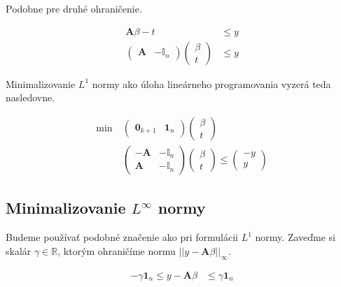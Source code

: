 \documentclass[12pt,oneside,a4paper,slovak]{article}
\begin{document}
Podobne pre druhé ohraničenie.

\begin{align*}
	\mathbf{A} \beta - t &\leq y \\
	\left(
		\begin{array}{c|c}
			\mathbf{A} & -\mathbb{I}_n
		\end{array}
	\right)
	\left(
		\begin{array}{c}
			\beta \\
			\hline
			t
		\end{array}
	\right) &\leq y
\end{align*}

Minimalizovanie $L^{1}$ normy ako úloha lineárneho programovania vyzerá teda nasledovne.

\begin{align*}
	\text{min}~ &
	\left(
		\begin{array}{c|c}
			\mathbf{0}_{k+1} & \mathbf{1}_n
		\end{array}
	\right)
	\left(
		\begin{array}{c}
			\beta \\
			\hline
			t
		\end{array}
	\right) \\
	&\left(
		\begin{array}{c|c}
			-\mathbf{A} & -\mathbb{I}_n \\
			\hline
			\mathbf{A} & -\mathbb{I}_n
		\end{array}
	\right)
	\left(
		\begin{array}{c}
			\beta \\
			\hline
			t
		\end{array}
	\right)
	\leq
	\left(
		\begin{array}{c}
			-y \\
			\hline
			y
		\end{array}
	\right)
\end{align*}

\newpage

\subsection*{Minimalizovanie $L^{\infty}$ normy}

Budeme používať podobné značenie ako pri formulácii $L^1$ normy. Zaveďme si skalár $\gamma \in \mathbb{R}$, ktorým ohraničíme normu $||y - \mathbf{A} \beta||_{\infty}$.

\begin{align*}
	-\gamma \mathbf{1}_n \leq y - \mathbf{A} \beta &\leq \gamma \mathbf{1}_n
\end{align*}
\end{document}
